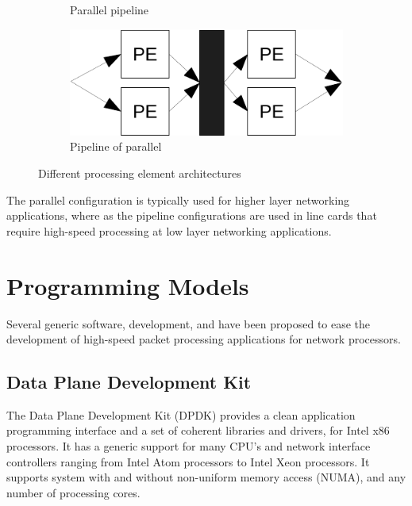 \begin{figure}
\begin{subfigure}[b]{0.475\textwidth}
    \caption[]%
    {{\small Parallel pipeline}}
    \label{fig:parallel-pipeline}
  \end{subfigure}
  \begin{subfigure}[b]{0.475\textwidth}
    \centering
    \includegraphics[scale=.5]{images/pipeline-parallel.pdf}
    \caption[]%
    {{\small Pipeline of parallel}}
    \label{fig:pipeline-parallel}
  \end{subfigure}
  \caption[]
  {\small Different processing element architectures}
  \label{fig:processing-element-organization}
\end{figure}

The parallel configuration is typically used for higher layer networking applications, where as the pipeline configurations are used in line cards that require high-speed processing at low layer networking applications.

\section{Programming Models}


Several generic software, development, and have been proposed to ease the development of high-speed packet processing applications for network processors.


\subsection{Data Plane Development Kit}
The Data Plane Development Kit (DPDK) provides a clean application programming interface and a set of coherent libraries and drivers, for Intel x86 processors. It has a generic support for many CPU's and network interface controllers ranging from Intel Atom processors to Intel Xeon processors. It supports system with and without non-uniform memory access (NUMA), and any number of processing cores.~\cite{Intel:DPDK:Doc}

